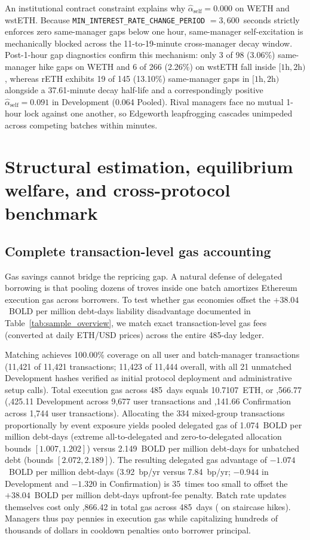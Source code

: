 An institutional contract constraint explains why $\hat{\alpha}_{\text{self}} = 0.000$ on WETH and wstETH. Because \texttt{MIN\_INTEREST\_RATE\_CHANGE\_PERIOD} $= 3{,}600$~seconds strictly enforces zero same-manager gaps below one hour, same-manager self-excitation is mechanically blocked across the 11-to-19-minute cross-manager decay window. Post-1-hour gap diagnostics confirm this mechanism: only 3 of 98 (3.06\%) same-manager hike gaps on WETH and 6 of 266 (2.26\%) on wstETH fall inside $[1\text{h}, 2\text{h})$, whereas rETH exhibits 19 of 145 (13.10\%) same-manager gaps in $[1\text{h}, 2\text{h})$ alongside a 37.61-minute decay half-life and a correspondingly positive $\hat{\alpha}_{\text{self}} = 0.091$ in Development (0.064 Pooled). Rival managers face no mutual 1-hour lock against one another, so Edgeworth leapfrogging cascades unimpeded across competing batches within minutes.

\section{Structural estimation, equilibrium welfare, and cross-protocol benchmark}\label{sec:structural}

\subsection{Complete transaction-level gas accounting}\label{subsec:gas}

Gas savings cannot bridge the repricing gap. A natural defense of delegated borrowing is that pooling dozens of troves inside one batch amortizes Ethereum execution gas across borrowers. To test whether gas economies offset the $+38.04$~BOLD per million debt-days liability disadvantage documented in Table~\ref{tab:sample_overview}, we match exact transaction-level gas fees (converted at daily ETH/USD prices) across the entire 485-day ledger.

Matching achieves 100.00\% coverage on all user and batch-manager transactions (11,421 of 11,421 transactions; 11,423 of 11,444 overall, with all 21 unmatched Development hashes verified as initial protocol deployment and administrative setup calls). Total execution gas across 485~days equals 10.7107~ETH, or ,566.77 (,425.11 Development across 9,677 user transactions and ,141.66 Confirmation across 1,744 user transactions). Allocating the 334 mixed-group transactions proportionally by event exposure yields pooled delegated gas of 1.074~BOLD per million debt-days (extreme all-to-delegated and zero-to-delegated allocation bounds $[1.007, 1.202]$) versus 2.149~BOLD per million debt-days for unbatched debt (bounds $[2.072, 2.189]$). The resulting delegated gas advantage of $-1.074$~BOLD per million debt-days (3.92~bp/yr versus 7.84~bp/yr; $-0.944$ in Development and $-1.320$ in Confirmation) is 35~times too small to offset the $+38.04$~BOLD per million debt-days upfront-fee penalty. Batch rate updates themselves cost only ,866.42 in total gas across 485~days ( on staircase hikes). Managers thus pay pennies in execution gas while capitalizing hundreds of thousands of dollars in cooldown penalties onto borrower principal.

